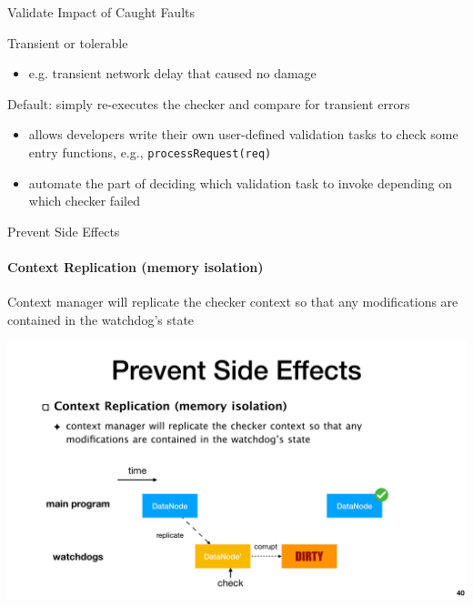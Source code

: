 \documentclass[aspectratio=169]{beamer}
\begin{document}
\begin{frame}{Validate Impact of Caught Faults}
    \begin{block}{Transient or tolerable}
        \begin{itemize}
            \item e.g. transient network delay that caused no damage
        \end{itemize}
    \end{block}

    \begin{block}{Default: simply re-executes the checker and compare for transient errors}
        \begin{itemize}
            \item  allows developers write their own user-defined validation tasks to check some entry functions, e.g., \texttt{processRequest(req)}
            \item automate the part of deciding which validation task to invoke depending on which checker failed 
        \end{itemize}
    \end{block}
    
\end{frame}

\begin{frame}{Prevent Side Effects}
    \framesubtitle{Context Replication (memory isolation)}
    Context manager will replicate the checker context so that any modifications are contained in the watchdog’s state

    \begin{center}
        \includegraphics[width=.9\textwidth]{fig/replicate}
    \end{center}
\end{frame}
\end{document}
